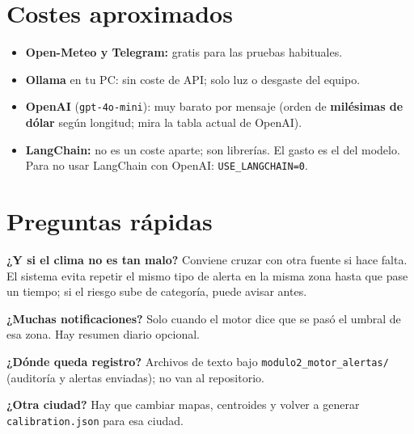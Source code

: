 \documentclass[11pt,a4paper]{article}
\begin{document}
\section*{Costes aproximados}
\begin{itemize}
  \item \textbf{Open-Meteo y Telegram:} gratis para las pruebas habituales.
  \item \textbf{Ollama} en tu PC: sin coste de API; solo luz o desgaste del equipo.
  \item \textbf{OpenAI} (\texttt{gpt-4o-mini}): muy barato por mensaje (orden de \textbf{milésimas de dólar} según longitud; mira la tabla actual de OpenAI).
  \item \textbf{LangChain:} no es un coste aparte; son librerías. El gasto es el del modelo. Para no usar LangChain con OpenAI: \texttt{USE\_LANGCHAIN=0}.
\end{itemize}

\section*{Preguntas rápidas}
\textbf{¿Y si el clima no es tan malo?} Conviene cruzar con otra fuente si hace falta. El sistema evita repetir el mismo tipo de alerta en la misma zona hasta que pase un tiempo; si el riesgo sube de categoría, puede avisar antes.

\textbf{¿Muchas notificaciones?} Solo cuando el motor dice que se pasó el umbral de esa zona. Hay resumen diario opcional.

\textbf{¿Dónde queda registro?} Archivos de texto bajo \texttt{modulo2\_motor\_alertas/} (auditoría y alertas enviadas); no van al repositorio.

\textbf{¿Otra ciudad?} Hay que cambiar mapas, centroides y volver a generar \texttt{calibration.json} para esa ciudad.
\end{document}
